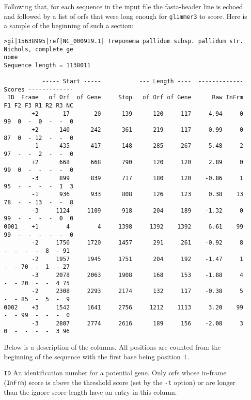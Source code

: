 \documentclass[fleqn,titlepage,11pt]{article}
\def\Pg#1{\texttt{#1}}
\begin{document}
Following that, for each sequence in the input file the
fasta-header line is echoed and followed by a list of orfs
that were long enough for \Pg{glimmer3} to score.  Here is
a sample of the beginning of such a section:
\BSV\begin{verbatim}
>gi|15638995|ref|NC_000919.1| Treponema pallidum subsp. pallidum str. Nichols, complete ge
nome
Sequence length = 1138011

           ----- Start -----           --- Length ----  ------------- Scores -------------
 ID  Frame   of Orf  of Gene     Stop   of Orf of Gene      Raw InFrm F1 F2 F3 R1 R2 R3 NC
        +2       17       20      139      120     117    -4.94     0 99  0  -  0  -  -  0
        +2      140      242      361      219     117     0.99     0 87  0  - 12  -  -  0
        -1      435      417      148      285     267     5.48     2 97  -  -  2  -  -  0
        +2      668      668      790      120     120     2.89     0 99  0  -  -  -  -  0
        -3      899      839      717      180     120    -0.86     1 95  -  -  -  -  1  3
        -1      936      933      808      126     123     0.38    13 78  -  - 13  -  -  8
        -3     1124     1109      918      204     189    -1.32     0 99  -  -  -  -  0  0
0001    +1        4        4     1398     1392    1392     6.61    99 99  -  -  -  -  -  0
        -2     1750     1720     1457      291     261    -0.92     8  -  -  -  -  8  - 91
        -2     1957     1945     1751      204     192    -1.47     1  -  - 70  -  1  - 27
        -3     2078     2063     1908      168     153    -1.88     4  -  - 20  -  -  4 75
        -2     2308     2293     2174      132     117    -0.38     5  -  - 85  -  5  -  9
0002    +3     1542     1641     2756     1212    1113     3.20    99  -  - 99  -  -  -  0
        -3     2807     2774     2616      189     156    -2.08     3  0  -  -  -  -  3 96\end{verbatim}\ESV
Below is a description of the columns.  All positions are counted from the beginning of
the sequence with the first base being position~$1$.
\RaggedRight
\item[\Pg{ID}]
  An identification number for a potential gene.  Only orfs whose in-frame (\Pg{InFrm})
  score is above the threshold score (set by the \Pg{-t} option) or are longer
  than the ignore-score length have an entry
  in this column.
\end{document}
